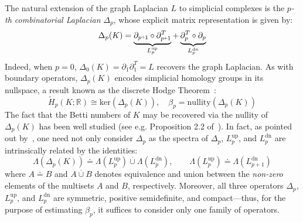 \documentclass[10pt]{article}
\numberwithin{equation}{section}
\newcommand{\+}{%
	\raisebox{0.18ex}{\scaleobj{0.55}{+}}
}
\theoremstyle{definition}
\theoremstyle{definition}
\begin{document}
The natural extension of the graph Laplacian $L$ to simplicial complexes is the \emph{$p$-th combinatorial Laplacian} $\Delta_p$, whose explicit matrix representation is given by: 
\begin{equation}\label{eq:comb_lap}
	\Delta_p(K) = 
	\underbrace{\partial_{p\+1} \circ \partial_{p\+1}^T}_{L_p^{\text{up}}} + \underbrace{\partial_{p}^T  \circ  \partial_{p}}_{L_p^{\text{dn}}} 
\end{equation}
\noindent Indeed, when $p = 0$, $\Delta_0(K) = \partial_1 \partial_1^T = L$ recovers the graph Laplacian. 
As with boundary operators, $\Delta_p(K)$ encodes simplicial homology groups in its nullspace, a result known as the discrete Hodge Theorem~\cite{}: 
\begin{equation}\label{eq:laplace_hom}
	\tilde{H}_p(K; \mathbb{R}) \cong \mathrm{ker}(\Delta_p(K)), \quad \beta_p = \mathrm{nullity}(\Delta_p(K))
\end{equation}
The fact that the Betti numbers of $K$ may be recovered via the nullity of $\Delta_p(K)$ has been well studied (see e.g. Proposition 2.2 of~\cite{}). 
In fact, as pointed out by~\cite{}, one need not only consider $\Delta_p$ as the spectra of $\Delta_p$, $L_p^{\text{up}}$, and $L_p^{\text{dn}}$ are intrinsically related by the identities:
\begin{equation}\label{eq:lap_spectra_conn}
	\Lambda(\Delta_p(K)) \doteq \Lambda(L_p^{\text{up}}) \stackrel{\cdot}{\cup} \Lambda(L_p^{\text{dn}}), \quad \quad \Lambda(L_p^{\text{up}}) \doteq \Lambda(L_{p+1}^{\text{dn}})
\end{equation}
where $A \doteq B$ and $A \stackrel{\cdot}{\cup} B$ denotes equivalence and union between the \emph{non-zero} elements of the multisets $A$ and $B$, respectively.
Moreover, all three operators $\Delta_p$, $L_p^{\text{up}}$, and $L_p^{\text{dn}}$ are symmetric, positive semidefinite, and compact---thus, for the purpose of estimating $\beta_p$, it suffices to consider only one family of operators.


\end{document}
